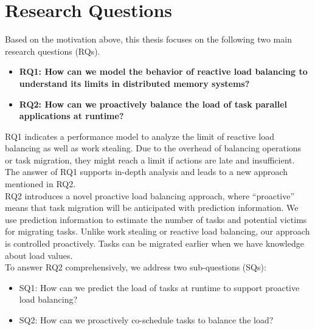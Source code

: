 \section{Research Questions}
\label{sec:intro_res_ques}

Based on the motivation above, this thesis focuses on the following two main research questions (RQs).
\begin{itemize}
	\item \textbf{RQ1: How can we model the behavior of reactive load balancing to understand its limits in distributed memory systems?}
	\item \textbf{RQ2: How can we proactively balance the load of task parallel applications at runtime?}
\end{itemize}

RQ1 indicates a performance model to analyze the limit of reactive load balancing as well as work stealing. Due to the overhead of balancing operations or task migration, they might reach a limit if actions are late and insufficient. The answer of RQ1 supports in-depth analysis and leads to a new approach mentioned in RQ2.\\

RQ2 introduces a novel proactive load balancing approach, where ``proactive'' means that task migration will be anticipated with prediction information. We use prediction information to estimate the number of tasks and potential victims for migrating tasks. Unlike work stealing or reactive load balancing, our approach is controlled proactively. Tasks can be migrated earlier when we have knowledge about load values.\\

To answer RQ2 comprehensively, we address two sub-questions (SQs):
\begin{itemize}
	\item SQ1: How can we predict the load of tasks at runtime to support proactive load balancing?
	\item SQ2: How can we proactively co-schedule tasks to balance the load?
\end{itemize}

